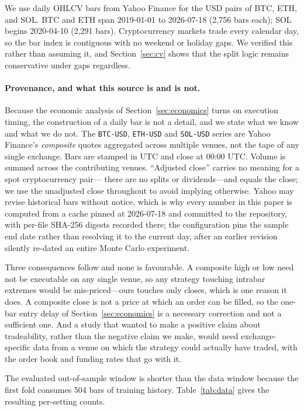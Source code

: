 \documentclass{article}
\theoremstyle{plain}
\theoremstyle{definition}
\begin{document}
We use daily OHLCV bars from Yahoo Finance for the USD pairs of BTC, ETH, and SOL. BTC and
ETH span 2019-01-01 to 2026-07-18 (2{,}756 bars each); SOL begins 2020-04-10 (2{,}291 bars).
Cryptocurrency markets trade every calendar day, so the bar index is contiguous with no
weekend or holiday gaps. We verified this rather than assuming it, and Section~\ref{sec:cv}
shows that the split logic remains conservative under gaps regardless.

\paragraph{Provenance, and what this source is and is not.}
Because the economic analysis of Section~\ref{sec:economics} turns on execution timing, the
construction of a daily bar is not a detail, and we state what we know and what we do not.
The \texttt{BTC-USD}, \texttt{ETH-USD} and \texttt{SOL-USD} series are Yahoo Finance's
\emph{composite} quotes aggregated across multiple venues, not the tape of any single
exchange. Bars are stamped in UTC and close at 00:00 UTC. Volume is summed across the
contributing venues. ``Adjusted close'' carries no meaning for a spot cryptocurrency pair---
there are no splits or dividends---and equals the close; we use the unadjusted close
throughout to avoid implying otherwise. Yahoo may revise historical bars without notice,
which is why every number in this paper is computed from a cache pinned at 2026-07-18 and
committed to the repository, with per-file SHA-256 digests recorded there; the configuration
pins the sample end date rather than resolving it to the current day, after an earlier
revision silently re-dated an entire Monte Carlo experiment.

Three consequences follow and none is favourable. A composite high or low need not be
executable on any single venue, so any strategy touching intrabar extremes would be
mis-priced---ours touches only closes, which is one reason it does. A composite close is not
a price at which an order can be filled, so the one-bar entry delay of
Section~\ref{sec:economics} is a necessary correction and not a sufficient one. And a study
that wanted to make a positive claim about tradeability, rather than the negative claim we
make, would need exchange-specific data from a venue on which the strategy could actually
have traded, with the order book and funding rates that go with it.

The evaluated out-of-sample window is shorter than the data window because the
first fold consumes 504 bars of training history. Table~\ref{tab:data} gives the
resulting per-setting counts.
\end{document}
